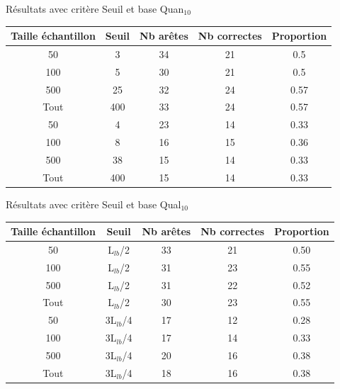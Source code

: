 \documentclass{beamer}
\begin{document}
\begin{frame}{Résultats avec critère Seuil et base Quan$_{10}$}

\begin{tabular}{|c|c|c|c|c|}
   \hline
   Taille échantillon & Seuil & Nb arêtes & Nb correctes & Proportion\\
   \hline
   50 & 3 & 34 & 21 & 0.5  \\   
   \hline
   100 & 5 & 30 & 21 & 0.5  \\
   \hline
   500 & 25 & 32 & 24 & 0.57  \\
   \hline
   Tout & 400 & 33 & 24 & 0.57 \\
   \hline
   \hline
   50 & 4 & 23 & 14 & 0.33  \\
   \hline
   100 & 8 & 16 & 15 & 0.36  \\
   \hline
   500 & 38 & 15 & 14 & 0.33  \\
   \hline
   Tout & 400 & 15 & 14 & 0.33 \\
   \hline

\end{tabular}


\end{frame}

\begin{frame}{Résultats avec critère Seuil et base Qual$_{10}$}

\begin{tabular}{|c|c|c|c|c|}
   \hline
   Taille échantillon & Seuil & Nb arêtes & Nb correctes & Proportion\\
    \hline
   50 & L$_{lb}$/2 & 33 & 21 & 0.50  \\
   \hline
   100 & L$_{lb}$/2 & 31 & 23 & 0.55  \\
   \hline
   500 & L$_{lb}$/2 & 31 & 22 & 0.52  \\
   \hline
   Tout & L$_{lb}$/2 & 30 & 23 & 0.55 \\
   \hline
   \hline
   50 & 3L$_{lb}$/4 & 17 & 12 & 0.28  \\
   \hline
   100 & 3L$_{lb}$/4 & 17 & 14 & 0.33  \\
   \hline
   500 & 3L$_{lb}$/4 & 20 & 16 & 0.38  \\
   \hline
   Tout & 3L$_{lb}$/4 & 18 & 16 & 0.38 \\
   \hline

\end{tabular}
\end{frame}
\end{document}

